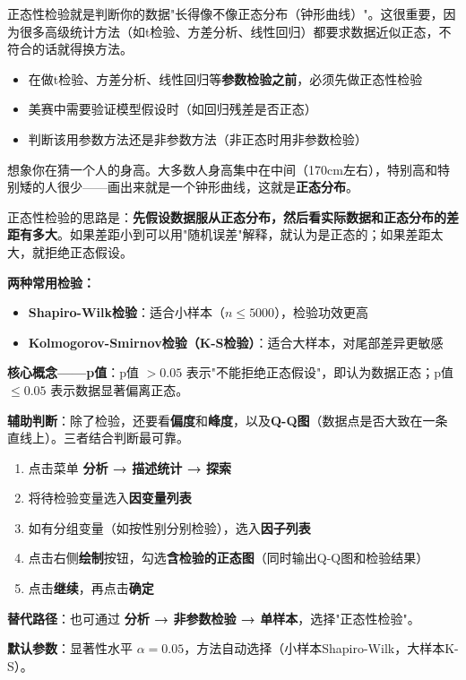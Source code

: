 
\begin{algointro}
正态性检验就是判断你的数据"长得像不像正态分布（钟形曲线）"。这很重要，因为很多高级统计方法（如t检验、方差分析、线性回归）都要求数据近似正态，不符合的话就得换方法。
\end{algointro}

\begin{algoscene}
\begin{itemize}
    \item 在做t检验、方差分析、线性回归等\textbf{参数检验之前}，必须先做正态性检验
    \item 美赛中需要验证模型假设时（如回归残差是否正态）
    \item 判断该用参数方法还是非参数方法（非正态时用非参数检验）
\end{itemize}
\end{algoscene}

\begin{algoprinciple}
想象你在猜一个人的身高。大多数人身高集中在中间（170cm左右），特别高和特别矮的人很少——画出来就是一个钟形曲线，这就是\textbf{正态分布}。

正态性检验的思路是：\textbf{先假设数据服从正态分布，然后看实际数据和正态分布的差距有多大}。如果差距小到可以用"随机误差"解释，就认为是正态的；如果差距太大，就拒绝正态假设。

\textbf{两种常用检验：}
\begin{itemize}
    \item \textbf{Shapiro-Wilk检验}：适合小样本（$n \leq 5000$），检验功效更高
    \item \textbf{Kolmogorov-Smirnov检验（K-S检验）}：适合大样本，对尾部差异更敏感
\end{itemize}

\textbf{核心概念——p值}：p值 $> 0.05$ 表示"不能拒绝正态假设"，即认为数据正态；p值 $\leq 0.05$ 表示数据显著偏离正态。

\textbf{辅助判断}：除了检验，还要看\textbf{偏度}和\textbf{峰度}，以及\textbf{Q-Q图}（数据点是否大致在一条直线上）。三者结合判断最可靠。
\end{algoprinciple}

\begin{algosposs}
\begin{enumerate}
    \item 点击菜单 \textbf{分析 → 描述统计 → 探索}
    \item 将待检验变量选入\textbf{因变量列表}
    \item 如有分组变量（如按性别分别检验），选入\textbf{因子列表}
    \item 点击右侧\textbf{绘制}按钮，勾选\textbf{含检验的正态图}（同时输出Q-Q图和检验结果）
    \item 点击\textbf{继续}，再点击\textbf{确定}
\end{enumerate}

\textbf{替代路径}：也可通过 \textbf{分析 → 非参数检验 → 单样本}，选择"正态性检验"。

\textbf{默认参数}：显著性水平 $\alpha=0.05$，方法自动选择（小样本Shapiro-Wilk，大样本K-S）。
\end{algosposs}

